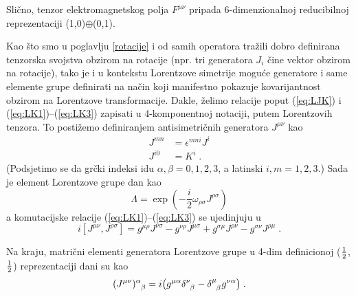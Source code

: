 Slično, tenzor elektromagnetskog polja $F^{\mu\nu}$ pripada
6-dimenzionalnoj reducibilnoj reprezentaciji (1,0)$\oplus$(0,1).


Kao što smo u poglavlju \ref{rotacije} i od samih operatora tražili
dobro definirana tenzorska svojstva obzirom na rotacije
(npr. tri generatora $J_i$ čine vektor obzirom na rotacije), tako
je i u kontekstu Lorentzove simetrije moguće generatore i
same elemente grupe definirati na način koji manifestno pokazuje
kovarijantnost obzirom na Lorentzove transformacije.
Dakle, želimo relacije poput (\ref{eq:LJK}) i (\ref{eq:LK1})--(\ref{eq:LK3}) 
zapisati u 4-komponentnoj notaciji, putem Lorentzovih tenzora.
To postižemo definiranjem antisimetričnih generatora $J^{\mu\nu}$ kao
\begin{align}
J^{mn}& = \epsilon^{mni} J^i \\
J^{i0}& = K^i \;.
\label{eq:defJmn}
\end{align}
(Podsjetimo se da grčki indeksi idu $\alpha,\beta = 0,1,2,3$, a 
latinski $i,m = 1,2,3$.)  
Sada je element Lorentzove grupe dan kao
\begin{equation}
 \Lambda = \exp\left(-\frac{i}{2} \omega_{\rho\sigma} J^{\rho\sigma}\right)
\label{eq:4DLorentz}
\end{equation}
a komutacijske relacije (\ref{eq:LK1})--(\ref{eq:LK3}) se ujedinjuju u
\begin{equation}
i [ J^{\mu\nu}, J^{\rho\sigma}] = g^{\mu\rho} J^{\nu\sigma}
- g^{\nu\rho} J^{\mu\sigma} + g^{\sigma\mu} J^{\rho\nu}
- g^{\sigma\nu} J^{\rho\mu} \;.
\label{eq:4DLorKom}
\end{equation}

Na kraju, matrični elementi generatora Lorentzove grupe u
4-dim definicionoj ($\frac{1}{2}$, $\frac{1}{2}$) reprezentaciji dani su kao
\begin{equation}
\tensor{(J^{\mu\nu})}{^\alpha_\beta} = i \big(
g^{\mu\alpha}\tensor{\delta}{^\nu_\beta} - \tensor{\delta}{^\mu_\beta}
g^{\nu\alpha} \big) \;.
\label{eq:4DJmn}
\end{equation}

